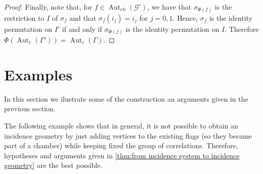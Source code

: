 \documentclass{amsart}
\theoremstyle{definition}
\theoremstyle{remark}
\newcommand{\Aut}{\operatorname{Aut}}
\newcommand{\Autcb}{\Aut_{\text{cb}}}
\newcommand{\Autc}{\Aut_{\text{c}}}
\newcommand{\G}{\mathcal{G}}
\begin{document}
\begin{proof}
Finally, note that, for $f\in \Autcb(\G')$, we have that $\sigma_{\Phi(f)}$ is the restriction to $I$ of $\sigma_f$ and that $\sigma_f(i_j)=i_j$ for $j=0,1$. Hence, $\sigma_f$ is the identity permutation on $I'$ if and only if $\sigma_{\Phi(f)}$ is the identity permutation on $I$. Therefore $\Phi(\Autc(\Gamma'))=\Autc(\Gamma)$.

\end{proof}

\section{Examples}\label{sec:example}

In this section we ilustrate some of the construction an arguments given in the previous section. 

The following example shows that in general, it is not possible to obtain an incidence geometry by just adding vertices to the existing flags (so they became part of a chamber) while keeping fixed the group of correlations. Therefore, hypotheses and arguments given in \autoref{thm:from incidence system to incidence geometry} are the best possible.
\end{document}
